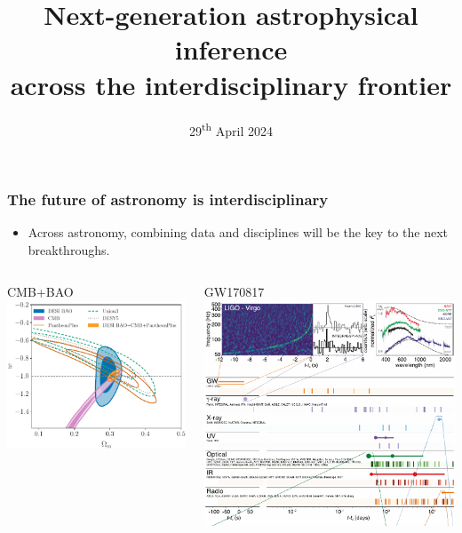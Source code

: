 \documentclass[aspectratio=169, handout]{beamer}
\title{Next-generation astrophysical inference\\across the interdisciplinary frontier}
\date{29\textsuperscript{th} April 2024}
\begin{document}
\begin{frame}
    \titlepage
\end{frame}

\begin{frame}
    \frametitle{The future of astronomy is interdisciplinary}
    \begin{itemize}
        \item Across astronomy, combining data and disciplines will be the key to the next breakthroughs.
    \end{itemize}
    \begin{columns}
        \begin{block}{CMB+BAO}
            \includegraphics[width=\textwidth]{figures/desi_w_constraints.pdf}
        \end{block}
        \begin{block}{GW170817}
            \includegraphics[width=\textwidth]{figures/mma_1.pdf}

\end{block}
\end{columns}
\end{frame}
\end{document}
